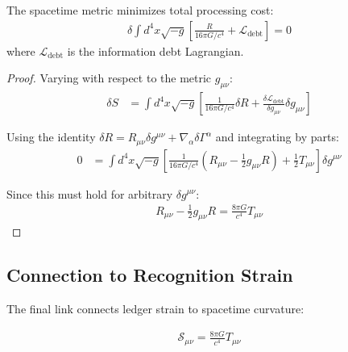 \documentclass[12pt]{article}
\begin{document}
\begin{theorem}
The spacetime metric minimizes total processing cost:
\begin{align}
\delta \int d^4x \sqrt{-g} \left[ \frac{R}{16\pi G/c^4} + \mathcal{L}_{\text{debt}} \right] = 0
\end{align}
where $\mathcal{L}_{\text{debt}}$ is the information debt Lagrangian.
\end{theorem}

\begin{proof}
Varying with respect to the metric $g_{\mu\nu}$:
\begin{align}
\delta S &= \int d^4x \sqrt{-g} \left[ \frac{1}{16\pi G/c^4} \delta R + \frac{\delta \mathcal{L}_{\text{debt}}}{\delta g_{\mu\nu}} \delta g_{\mu\nu} \right]
\end{align}

Using the identity $\delta R = R_{\mu\nu} \delta g^{\mu\nu} + \nabla_\alpha \delta \Gamma^\alpha$ and integrating by parts:
\begin{align}
0 &= \int d^4x \sqrt{-g} \left[ \frac{1}{16\pi G/c^4} \left(R_{\mu\nu} - \frac{1}{2} g_{\mu\nu} R\right) + \frac{1}{2} T_{\mu\nu} \right] \delta g^{\mu\nu}
\end{align}

Since this must hold for arbitrary $\delta g^{\mu\nu}$:
\begin{align}
R_{\mu\nu} - \frac{1}{2} g_{\mu\nu} R = \frac{8\pi G}{c^4} T_{\mu\nu}
\end{align}
\end{proof}

\subsection{Connection to Recognition Strain}

The final link connects ledger strain to spacetime curvature:

\begin{theorem}
\begin{align}
\mathcal{S}_{\mu\nu} = \frac{8\pi G}{c^4} T_{\mu\nu}
\end{align}
\end{theorem}
\end{document}
